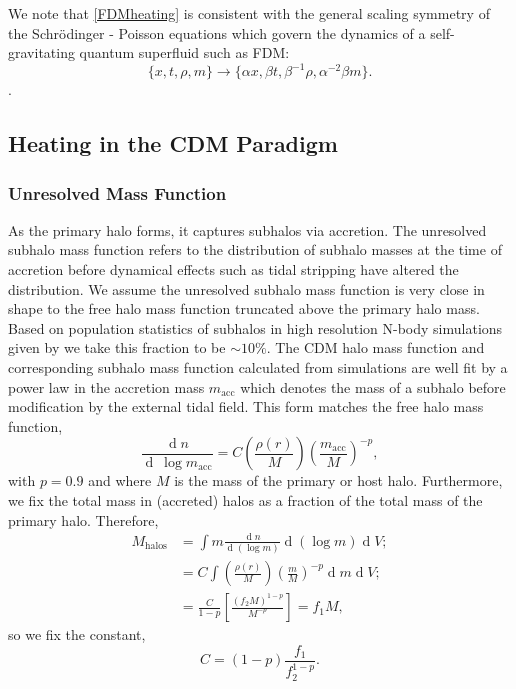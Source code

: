 \documentclass[usenatbib]{mnras}
\renewcommand{\d}[1]{\! \mathrm{d}#1 \:}
\newcommand{\deriv}[2]{\frac{\d{#1}}{\d{#2}}}
\renewcommand{\d}[1]{\ensuremath{\operatorname{d}\!{#1}}}
\begin{document}
\par
We note that \eqref{FDMheating} is consistent with the general scaling symmetry of the Schr\"{o}dinger - Poisson equations which govern the dynamics of a self-gravitating quantum superfluid such as FDM:
\begin{equation}
\{ x, t , \rho, m \} \to \{\alpha x, \beta t, \beta^{-1} \rho, \alpha^{-2} \beta m \} .
\end{equation}
\noindent \citep{Schrodinger-Poisson}.
\subsection{Heating in the CDM Paradigm}
\subsubsection{Unresolved Mass Function}

As the primary halo forms, it captures subhalos via accretion. The unresolved subhalo mass function refers to the distribution of subhalo masses at the time of accretion before dynamical effects such as tidal stripping have altered the distribution. We assume the unresolved subhalo mass function is very close in shape to the free halo mass function truncated above the primary halo mass. Based on population statistics of subhalos in high resolution N-body simulations given by \citet{subhalo_abundance} we take this fraction to be $\sim 10\%$. The CDM halo mass function and corresponding subhalo mass function calculated from simulations \citep{pop_of_subhalos, unified_model} are well fit by a power law in the accretion mass $m_{\text{acc}}$ which denotes the mass of a subhalo before modification by the external tidal field. This form matches the free halo mass function, 
\begin{equation}
\frac{\d{n}}{\d{\: \log{m_{\text{acc}}}}} = C \left(\frac{\rho(r)}{M}\right) \left(\frac{m_{\text{acc}}}{M} \right)^{-p} ,
\end{equation}
with $p = 0.9$ and where $M$ is the mass of the primary or host halo.
Furthermore, we fix the total mass in (accreted) halos as a fraction of the total mass of the primary halo. Therefore,
\begin{subequations}
\begin{align}
M_{\mathrm{halos}} & = \int m \deriv{n}{(\log{m})} \d{(\log{m})} \d{V} ;
\\
& = C \int \left(\frac{\rho(r)}{M}\right) \left(\frac{m}{M} \right)^{-p} \d{m} \d{V} ;
\\
& = \frac{C}{1-p} \left[ \frac{(f_2 M)^{1-p}}{M^{-p}} \right] = f_1 M ,
\end{align} 
\end{subequations}
so we fix the constant,
\begin{equation}
C = (1 - p)\frac{f_1}{f_2^{1-p}} .
\end{equation}
\end{document}
